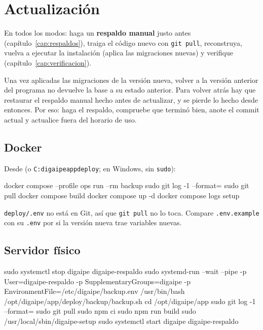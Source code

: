 \chapter{Actualización}
\label{cap:actualizacion}

En todos los modos: haga un \textbf{respaldo manual} justo antes (capítulo~\ref{cap:respaldos}),
traiga el código nuevo con \texttt{git pull}, reconstruya, vuelva a ejecutar la instalación
(aplica las migraciones nuevas) y verifique (capítulo~\ref{cap:verificacion}).

\begin{aviso}
	Una vez aplicadas las migraciones de la versión nueva, volver a la versión anterior del
	programa no devuelve la base a su estado anterior. Para volver atrás hay que restaurar el
	respaldo manual hecho antes de actualizar, y se pierde lo hecho desde entonces. Por eso: haga
	el respaldo, compruebe que terminó bien, anote el commit actual y actualice fuera del horario
	de uso.
\end{aviso}

\section{Docker}

Desde  (o \texttt{C:\bs digaipe\bs app\bs deploy}; en Windows,
sin \texttt{sudo}):

\begin{codigo}
docker compose --profile ops run --rm backup
sudo git log -1 --format=%
sudo git pull
docker compose build
docker compose up -d
docker compose logs setup
\end{codigo}

\texttt{deploy/.env} no está en Git, así que \texttt{git pull} no lo toca. Compare
\texttt{.env.example} con su \texttt{.env} por si la versión nueva trae variables nuevas.

\section{Servidor físico}

\begin{codigo}
sudo systemctl stop digaipe digaipe-respaldo
sudo systemd-run --wait --pipe -p User=digaipe-respaldo -p SupplementaryGroups=digaipe -p EnvironmentFile=/etc/digaipe/backup.env /usr/bin/bash /opt/digaipe/app/deploy/backup/backup.sh
cd /opt/digaipe/app
sudo git log -1 --format=%
sudo git pull
sudo npm ci
sudo npm run build
sudo /usr/local/sbin/digaipe-setup
sudo systemctl start digaipe digaipe-respaldo
\end{codigo}

